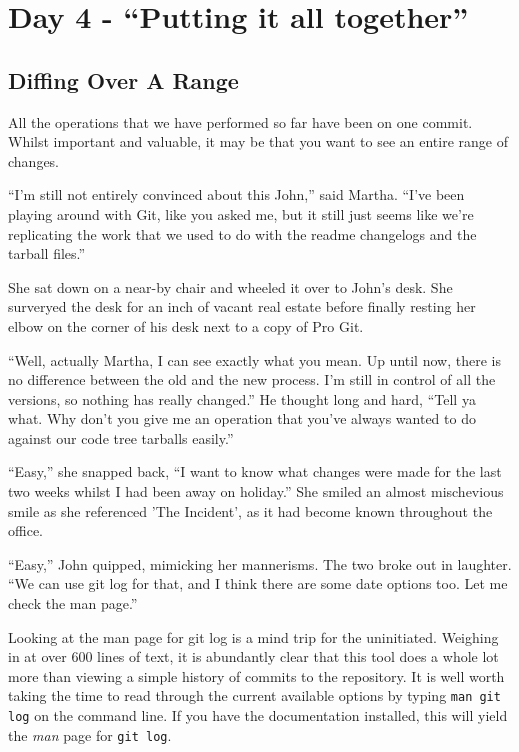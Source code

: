 \section{Day 4 - ``Putting it all together''}
\subsection{Diffing Over A Range}
All the operations that we have performed so far have been on one commit.  Whilst important and valuable, it may be that you want to see an entire range of changes.  

\begin{trenches}
``I'm still not entirely convinced about this John,'' said Martha.  ``I've been playing around with Git, like you asked me, but it still just seems like we're replicating the work that we used to do with the readme changelogs and the tarball files.''

She sat down on a near-by chair and wheeled it over to John's desk.  She surveryed the desk for an inch of vacant real estate before finally resting her elbow on the corner of his desk next to a copy of Pro Git.

``Well, actually Martha, I can see exactly what you mean.  Up until now, there is no difference between the old and the new process.  I'm still in control of all the versions, so nothing has really changed.''  He thought long and hard, ``Tell ya what.  Why don't you give me an operation that you've always wanted to do against our code tree tarballs easily.''

``Easy,'' she snapped back, ``I want to know what changes were made for the last two weeks whilst I had been away on holiday.'' She smiled an almost mischevious smile as she referenced 'The Incident', as it had become known throughout the office.

``Easy,'' John quipped, mimicking her mannerisms.  The two broke out in laughter.  ``We can use git log for that, and I think there are some date options too.  Let me check the man page.''
\end{trenches}

Looking at the man page for git log is a mind trip for the uninitiated.  Weighing in at over 600 lines of text, it is abundantly clear that this tool does a whole lot more than viewing a simple history of commits to the repository.  It is well worth taking the time to read through the current available options by typing \texttt{man git log} on the command line.  If you have the documentation installed, this will yield the \emph{man} page for \texttt{git log}.

